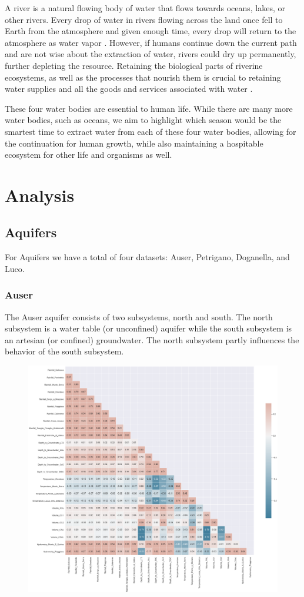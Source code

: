 \documentclass[12pt, letterpaper]{article}
\begin{document}
A river is a natural flowing body of water that flows towards oceans, lakes, or other rivers. Every drop of water in rivers flowing across the land once fell to Earth from the atmosphere and given enough time, every drop will return to the atmosphere as water vapor \cite{karr1998restoring}. However, if humans continue down the current path and are not wise about the extraction of water, rivers could dry up permanently, further depleting the resource. Retaining the biological parts of riverine ecosystems, as well as the processes that nourish them is crucial to retaining water supplies and all the goods and services associated with water \cite{karr1998restoring}. 

These four water bodies are essential to human life. While there are many more water bodies, such as oceans, we aim to highlight which season would be the smartest time to extract water from each of these four water bodies, allowing for the continuation for human growth, while also maintaining a hospitable ecosystem for other life and organisms as well. 

\section{Analysis}
\subsection{Aquifers}
For Aquifers we have a total of four datasets: Auser, Petrigano, Doganella, and Luco.
\subsubsection{Auser}
The Auser aquifer consists of two subsystems, north and south. The north subsystem is a water table (or unconfined) aquifer while the south subsystem is an artesian (or confined) groundwater. The north subsystem partly influences the behavior of the south subsystem.

\begin{figure}[H]
    \includegraphics[width=1\textwidth]{aq_auser_heatmap.png}
    \centering
\end{figure}
\end{document}
